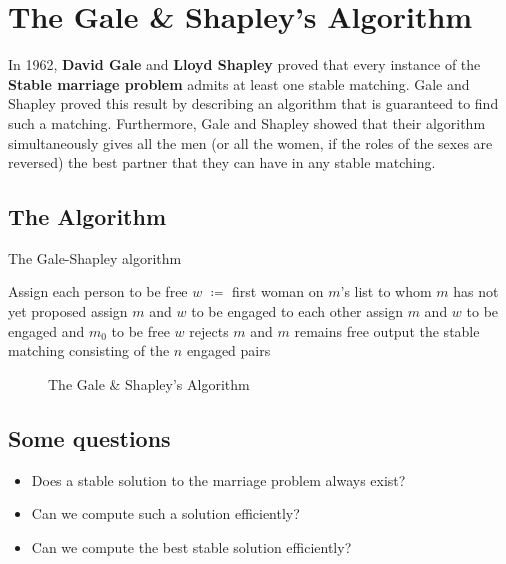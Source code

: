 \section{The Gale \& Shapley's Algorithm}

In 1962, \textbf{David Gale} and \textbf{Lloyd Shapley} proved that every instance of the \textbf{Stable marriage problem} admits at least one stable matching. Gale and Shapley proved this result by describing an algorithm that is guaranteed to find such a matching. Furthermore, Gale and Shapley showed that their algorithm  simultaneously gives all the men (or all the women, if the roles of the sexes are reversed) the best partner that they can have in any stable matching\cite{marden}. 

\subsection{The Algorithm}

\begin{center}
\begin{minipage}{.9\linewidth}
\begin{algorithm}[H]
\caption{The Gale-Shapley algorithm}
\begin{algorithmic}[1]

\State Assign each person to be free
    \State $w$ $\coloneqq$ first woman on $m$'s list to whom $m$ has not yet proposed\;
        \State assign $m$ and $w$ to be engaged {to each other}
    \Else
            \State assign $m$ and $w$ to be engaged and $m_0$ to be free
        \Else
            \State $w$ rejects $m$ {and $m$ remains free}
        \EndIf
    \EndIf
\EndWhile
\State output the stable matching consisting of the $n$ engaged pairs
\end{algorithmic}
\end{algorithm}
\end{minipage}
\begin{figure}[ht]
  \caption{The Gale \& Shapley's Algorithm}
  \label{FIG_1_8}
\end{figure}

\end{center}

\subsection{Some questions}
\begin{itemize}
\item Does a stable solution to the marriage problem always exist?
\item Can we compute such a solution efficiently?
\item Can we compute the best stable solution efficiently?
\end{itemize}

